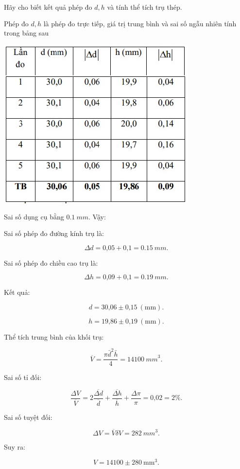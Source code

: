 \begin{enumerate}[label=\bfseries Bài \arabic*:]
{		Hãy cho biết kết quả phép đo $d, h$ và tính thể tích trụ thép.
	}
	
	\hideall
	{	
		Phép đo $d, h$ là phép đo trực tiếp, giá trị
		trung bình và sai số ngẫu nhiên tính trong
		bảng sau
		
		\begin{center}
			\includegraphics[scale=1]{../figs/VN10-2022-PH-TP003-9.jpg}
		\end{center}
		
		Sai số dụng cụ bằng $\SI{0,1}{mm}$. Vậy:
		
		Sai số phép đo đường kính trụ là:
		
		$$\Delta d = \text{0,05} + \text{0,1} =\SI{0,15}{mm}.$$
		
		Sai số phép đo chiều cao trụ là:
		
		$$\Delta h = \text{0,09} + \text{0,1} =\SI{0,19}{mm}.$$
		
		Kết quả: 
		
		$$d = \text{30,06} \pm \text{0,15}\ (\text{mm}).$$
		
		$$h = \text{19,86} \pm \text{0,19}\ (\text{mm}).$$
		
		Thể tích trung bình của khối trụ:
		
		$$\overline{V}  = \dfrac{\pi \bar{d}^2 \bar{h}}{4} =\SI{14100}{mm}^3.$$
		
		Sai số tỉ đối:
		
		$$\dfrac{\Delta V}{\overline V} = 2 \dfrac{\overline{\Delta d}}{\overline d} + \dfrac{\overline {\Delta h}}{\overline{h}} + \dfrac{\Delta \pi}{\pi} = \text{0,02} = 2\%.$$
		
		Sai số tuyệt đối:
		
		$$\Delta V = \overline{V} \delta V = \SI{282}{mm}^3.$$
		
		Suy ra:
		
		$$V = 14100 \pm 280 \ \text{mm}^3.$$
		
		
	}
	
\end{enumerate}